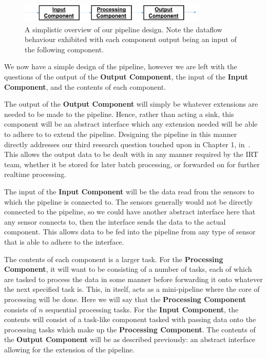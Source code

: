 \begin{figure}[h]
  \centering
  \includegraphics[width=0.8\textwidth]{includes/figures/fig_pipeline_simple}
  \caption{A simplistic overview of our pipeline design. Note the dataflow behaviour exhibited with each component output
  being an input of the following component.}
  \label{fig:pipeline_simple}
\end{figure}

We now have a simple design of the pipeline, however we are left with the questions of the output of the \textbf{Output Component},
the input of the \textbf{Input Component}, and the contents of each component.

The output of the \textbf{Output Component}
will simply be whatever extensions are needed to be made to the pipeline. Hence, rather than acting a sink, this component
will be an abstract interface which any extension needed will be able to adhere to to extend the pipeline. Designing the pipeline
in this manner directly addresses our third research question touched upon in Chapter 1, in~.
This allows the output data to be dealt with in any manner required by the IRT team, whether it be stored for later
batch processing, or forwarded on for further realtime processing.

The input of the \textbf{Input Component} will be the data read from the sensors to which the pipeline is connected to.
The sensors generally would not be directly connected to the pipeline, so we could have another abstract interface here
that any sensor connects to, then the interface sends the data to the actual component. This allows data to be fed into
the pipeline from any type of sensor that is able to adhere to the interface.

The contents of each component is a larger task. For the \textbf{Processing Component}, it will want to be consisting
of a number of tasks, each of which are tasked to process the data in some manner before forwarding it onto whatever
the next specified task is. This, in itself, acts as a mini-pipeline where the core of processing will be done. Here
we will say that the \textbf{Processing Component} consists of $n$ sequential processing tasks. For the \textbf{Input Component},
the contents will consist of a task-like component tasked with passing data onto the processing tasks which make up the
\textbf{Processing Component}. The contents of the
\textbf{Output Component} will be as described previously: an abstract interface allowing for the extension of the pipeline.

